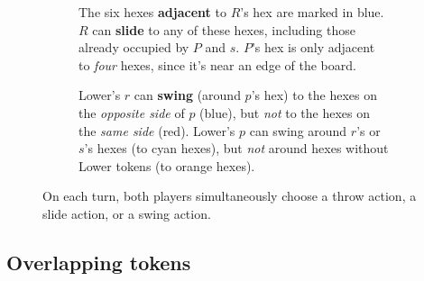 \documentclass[]{article}
\newcommand{\hex}[4] {
    \node[hex,fill={#3}] at ({#1}, {#2}) {};
    \node[hex,thick,draw={#3},fill={#3!10}] at ({#1}, {#2}) {};
    \node at ({#1}, {#2}) {{#4}};
}
\newcommand{\uptoken}[3] {
    \node[draw,circle,minimum size=6.8mm,fill=white] at (#1, #2) {};
    \node[draw,circle,minimum size=5.2mm,very thick,black]  at (#1, #2) {};
    \node[] at (#1, #2) {#3};
}
\newcommand{\lotoken}[3] {
    \node[draw,circle,minimum size=6.8mm,fill=white] at (#1, #2) {};
    \node[draw,circle,minimum size=5.2mm,very thick,purple] at (#1, #2) {};
    \node[] at (#1, #2) {#3};
}
\newcommand{\board} {
    \tikzset{
        hex/.style={
            regular polygon,
            regular polygon sides=6,
            minimum size=10mm,
            inner sep=0mm,
            outer sep=0mm,
            rotate=30,
            draw
        },
        x={(4.33mm,7.5mm)},
        y={(8.66mm,0mm)}
    }
    \foreach \r/\q in {
                    +4/-4,+4/-3,+4/-2,+4/-1,+4/+0,
                 +3/-4,+3/-3,+3/-2,+3/-1,+3/+0,+3/+1,
              +2/-4,+2/-3,+2/-2,+2/-1,+2/+0,+2/+1,+2/+2,
           +1/-4,+1/-3,+1/-2,+1/-1,+1/+0,+1/+1,+1/+2,+1/+3,
        +0/-4,+0/-3,+0/-2,+0/-1,+0/+0,+0/+1,+0/+2,+0/+3,+0/+4,
           -1/-3,-1/-2,-1/-1,-1/+0,-1/+1,-1/+2,-1/+3,-1/+4,
              -2/-2,-2/-1,-2/+0,-2/+1,-2/+2,-2/+3,-2/+4,
                 -3/-1,-3/+0,-3/+1,-3/+2,-3/+3,-3/+4,
                    -4/+0,-4/+1,-4/+2,-4/+3,-4/+4,
    }
        \node[hex,fill=black!5] at (\r, \q) {};
}
\begin{document}
\begin{figure}[ht!]
\begin{subfigure}{.27\textwidth}
    \caption{\label{fig:slide}
        The six hexes \textbf{adjacent} to $R$'s hex are marked in
        {\color{blue}blue}.
        $R$ can \textbf{slide} to any of these hexes, including those
        already occupied by $P$ and $s$.
        $P$'s hex is only adjacent to \emph{four} hexes, since it's near
        an edge of the board.
    }
\end{subfigure}
\begin{subfigure}{.01\textwidth}\end{subfigure}
\begin{subfigure}{.32\textwidth}
    \centering
    \caption{\label{fig:swing}
        Lower's $r$ can \textbf{swing} (around $p$'s hex) to the hexes on
        the \emph{opposite side} of $p$ ({\color{blue}blue}), but \emph{not}
        to the hexes on the \emph{same side} ({\color{red}red}).
        Lower's $p$ can swing around $r$'s or $s$'s hexes (to
        {\color{cyan}cyan} hexes), but \emph{not} around hexes without
        Lower tokens (to {\color{orange}orange} hexes).
    }
\end{subfigure}
\caption{
    On each turn, both players simultaneously choose a throw action,
    a slide action, or a swing action.
}
\end{figure}

\newpage

\subsection*{Overlapping tokens}
\end{document}
